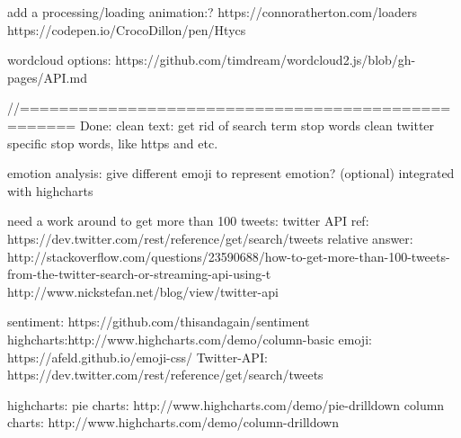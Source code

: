 add a processing/loading animation:?
https://connoratherton.com/loaders
https://codepen.io/CrocoDillon/pen/Htycs


wordcloud options:
https://github.com/timdream/wordcloud2.js/blob/gh-pages/API.md


//===================================================
Done:
clean text:
get rid of search term
stop words
clean twitter specific stop words, like https and etc.

emotion analysis:
give different emoji to represent emotion? (optional)
integrated with highcharts

need a work around to get more than 100 tweets:
twitter API ref: https://dev.twitter.com/rest/reference/get/search/tweets
relative answer: http://stackoverflow.com/questions/23590688/how-to-get-more-than-100-tweets-from-the-twitter-search-or-streaming-api-using-t
http://www.nickstefan.net/blog/view/twitter-api


sentiment: https://github.com/thisandagain/sentiment
highcharts:http://www.highcharts.com/demo/column-basic
emoji: https://afeld.github.io/emoji-css/
Twitter-API: https://dev.twitter.com/rest/reference/get/search/tweets

highcharts:
pie charts:  http://www.highcharts.com/demo/pie-drilldown
column charts: http://www.highcharts.com/demo/column-drilldown
